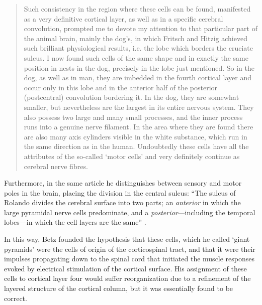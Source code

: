 \blockquote[{\protect\cite{Betz1874, Kushchayev2012}}]{Such consistency in the region where these cells can be found, manifested as a very definitive cortical layer, as well as in a specific cerebral convolution, prompted me to devote my attention to that particular part of the animal brain, mainly the dog’s, in which Fritsch and Hitzig achieved such brilliant physiological results, i.e. the lobe which borders the cruciate sulcus. I now found such cells of the same shape and in exactly the same position in nests in the dog, precisely in the lobe just mentioned. So in the dog, as well as in man, they are imbedded in the fourth cortical layer and occur only in this lobe and in the anterior half of the posterior (postcentral) convolution bordering it. In the dog, they are somewhat smaller, but nevertheless are the largest in its entire nervous system. They also possess two large and many small processes, and the inner process runs into a genuine nerve filament. In the area where they are found there are also many axis cylinders visible in the white substance, which run in the same direction as in the human. Undoubtedly these cells have all the attributes of the so-called ‘motor cells’ and very definitely continue as cerebral nerve fibres.}

Furthermore, in the same article he distinguishes between sensory and motor poles in the brain, placing the division in the central sulcus: ``The sulcus of Rolando divides the cerebral surface into two parts; an \emph{anterior} in which the large pyramidal nerve cells predominate, and a \emph{posterior}---including the temporal lobes---in which the cell layers are the same'' \cite{Betz1874,Clarke1996}.

In this way, Betz founded the hypothesis that these cells, which he called ‘giant pyramids’ were the cells of origin of the corticospinal tract, and that it were their impulses propagating down to the spinal cord that initiated the muscle responses evoked by electrical stimulation of the cortical surface. His assignment of these cells to cortical layer four would suffer reorganization due to a refinement of the layered structure of the cortical column, but it was essentially found to be correct.

